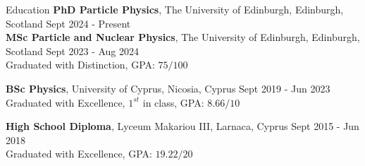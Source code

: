 \documentclass{resume} %
\begin{document}
        \begin{rSection}{Education}
                {\bf PhD Particle Physics}, The University of Edinburgh, Edinburgh, Scotland \hfill {Sept 2024 - Present}\\

                {\bf MSc Particle and Nuclear Physics}, The University of Edinburgh, Edinburgh, Scotland \hfill {Sept 2023 - Aug 2024}\\
                Graduated with Distinction, GPA: $75/100$
                
                {\bf BSc Physics}, University of Cyprus, Nicosia, Cyprus \hfill {Sept 2019 - Jun 2023}\\
                Graduated with Excellence, $1^{st}$ in class, GPA: $8.66/10$
                
                {\bf High School Diploma}, Lyceum Makariou III, Larnaca, Cyprus \hfill {Sept 2015 - Jun 2018}\\
        Graduated with Excellence, GPA: $19.22/20$
        \end{rSection}

        \bigbreak
\end{document}
